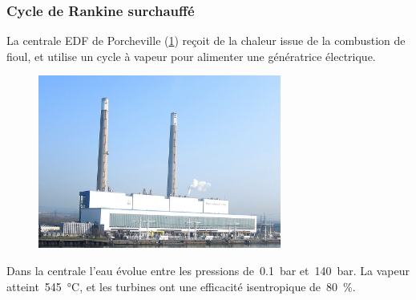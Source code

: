 \begin{boiboiboite}
	\propeau
	\propair
\end{boiboiboite}

\subsubsection{Cycle de Rankine surchauffé}
\label{exo_porcheville_rankine}

	La centrale EDF de Porcheville (\cref{fig_porcheville}) reçoit de la chaleur issue de la combustion de fioul, et utilise un cycle à vapeur pour alimenter une génératrice électrique.
	
	\begin{figure}
		\begin{center}
			\includegraphics[width=8cm]{images/porcheville.jpg}
			\vspace{-0.5cm}%
		\end{center}
		\label{fig_porcheville}
	\end{figure}
	
	Dans la centrale l’eau évolue entre les pressions de~\SI{0,1}{\bar} et~\SI{140}{\bar}. La vapeur atteint~\SI{545}{\degreeCelsius}, et les turbines ont une efficacité isentropique de~\SI{80}{\percent}.

